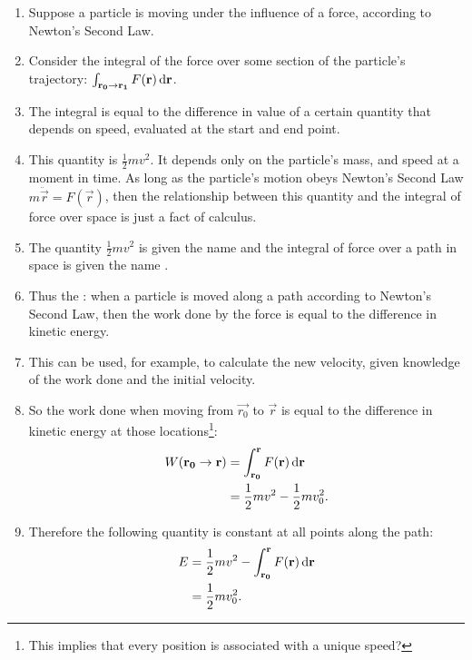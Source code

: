 \begin{enumerate}
\item Suppose a particle is moving under the influence of a force, according to Newton's Second Law.

\item Consider the integral of the force over some section of the particle's
  trajectory: $\int_{\vec{r_0 \to \vec{r_1}}} F(\vec{r}) \dif \vec{r}$.

\item The integral is equal to the difference in value of a certain quantity that depends on speed, evaluated at
  the start and end point.

\item This quantity is $\frac{1}{2}mv^2$. It depends only on the particle's mass, and speed at a moment in
  time. As long as the particle's motion obeys Newton's Second Law $m\ddot{\vec{r}} = F(\vec{r})$, then the
  relationship between this quantity and the integral of force over space is just a fact of calculus.

\item The quantity $\frac{1}{2}mv^2$ is given the name  and the integral of force over a path
  in space is given the name .

\item Thus the : when a particle is moved along a path according to Newton's Second Law,
  then the work done by the force is equal to the difference in kinetic energy.

\item This can be used, for example, to calculate the new velocity, given knowledge of the work done and the
  initial velocity.

\item So the work done when moving from $\vec{r_0}$ to $\vec{r}$ is equal to the difference in kinetic energy at
  those locations\footnote{This implies that every position is associated with a unique speed?}:
  \begin{align*}
    W(\vec{r_0} \to \vec{r})
    &= \int_{\vec{r_0}}^{\vec{r}} F(\vec{r}) \dif \vec{r} \\
    &= \frac{1}{2}mv^2 - \frac{1}{2}mv_0^2.
  \end{align*}

\item Therefore the following quantity is constant at all points along the path:
  \begin{align*}
    E
    &= \frac{1}{2}mv^2 - \int_{\vec{r_0}}^{\vec{r}} F(\vec{r}) \dif \vec{r} \\
    &= \frac{1}{2}mv_0^2.
  \end{align*}
\end{enumerate}




